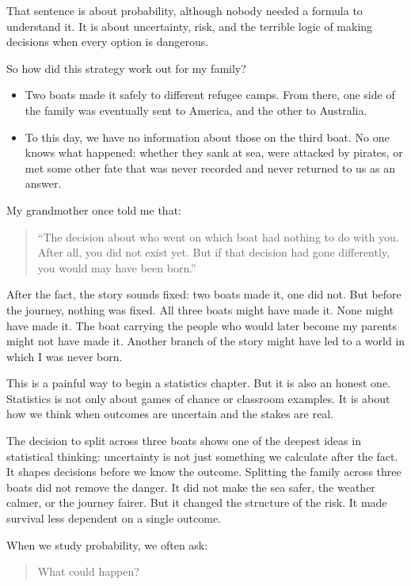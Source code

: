 \documentclass[
  letterpaper,
  DIV=11,
  numbers=noendperiod]{scrreprt}
\providecommand{\tightlist}{%
  \setlength{\itemsep}{0pt}\setlength{\parskip}{0pt}}
\begin{document}
That sentence is about probability, although nobody needed a formula to
understand it. It is about uncertainty, risk, and the terrible logic of
making decisions when every option is dangerous.

So how did this strategy work out for my family?

\begin{itemize}
\tightlist
\item
  Two boats made it safely to different refugee camps. From there, one
  side of the family was eventually sent to America, and the other to
  Australia.
\item
  To this day, we have no information about those on the third boat. No
  one knows what happened: whether they sank at sea, were attacked by
  pirates, or met some other fate that was never recorded and never
  returned to us as an answer.
\end{itemize}

My grandmother once told me that:

\begin{quote}
``The decision about who went on which boat had nothing to do with you.
After all, you did not exist yet. But if that decision had gone
differently, you would may have been born.''
\end{quote}

After the fact, the story sounds fixed: two boats made it, one did not.
But before the journey, nothing was fixed. All three boats might have
made it. None might have made it. The boat carrying the people who would
later become my parents might not have made it. Another branch of the
story might have led to a world in which I was never born.

This is a painful way to begin a statistics chapter. But it is also an
honest one. Statistics is not only about games of chance or classroom
examples. It is about how we think when outcomes are uncertain and the
stakes are real.

The decision to split across three boats shows one of the deepest ideas
in statistical thinking: uncertainty is not just something we calculate
after the fact. It shapes decisions before we know the outcome.
Splitting the family across three boats did not remove the danger. It
did not make the sea safer, the weather calmer, or the journey fairer.
But it changed the structure of the risk. It made survival less
dependent on a single outcome.

When we study probability, we often ask:

\begin{quote}
What could happen?
\end{quote}
\end{document}
